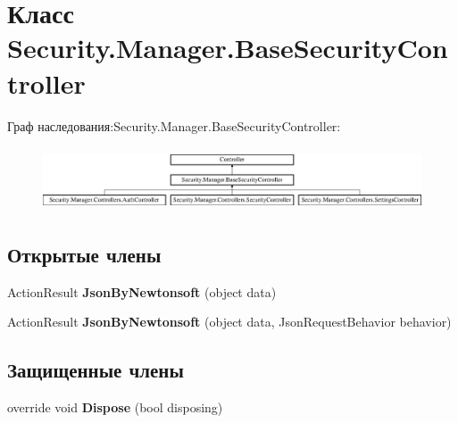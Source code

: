 \hypertarget{class_security_1_1_manager_1_1_base_security_controller}{}\section{Класс Security.\+Manager.\+Base\+Security\+Controller}
\label{class_security_1_1_manager_1_1_base_security_controller}
Граф наследования\+:Security.\+Manager.\+Base\+Security\+Controller\+:\begin{figure}[H]
\begin{center}
\leavevmode
\includegraphics[height=1.898305cm]{da/d0a/class_security_1_1_manager_1_1_base_security_controller}
\end{center}
\end{figure}
\subsection*{Открытые члены}
\begin{DoxyCompactItemize}
\item 
\mbox{\label{class_security_1_1_manager_1_1_base_security_controller_a97151dd928ec625bd0869e96e2fddffe}} 
Action\+Result {\bfseries Json\+By\+Newtonsoft} (object data)
\item 
\mbox{\label{class_security_1_1_manager_1_1_base_security_controller_ad6ac9c287aa236e2ccfc553b66c9c6db}} 
Action\+Result {\bfseries Json\+By\+Newtonsoft} (object data, Json\+Request\+Behavior behavior)
\end{DoxyCompactItemize}
\subsection*{Защищенные члены}
\begin{DoxyCompactItemize}
\item 
\mbox{\label{class_security_1_1_manager_1_1_base_security_controller_aec635590761efee5cd32d4d5cf226ce3}} 
override void {\bfseries Dispose} (bool disposing)
\end{DoxyCompactItemize}
